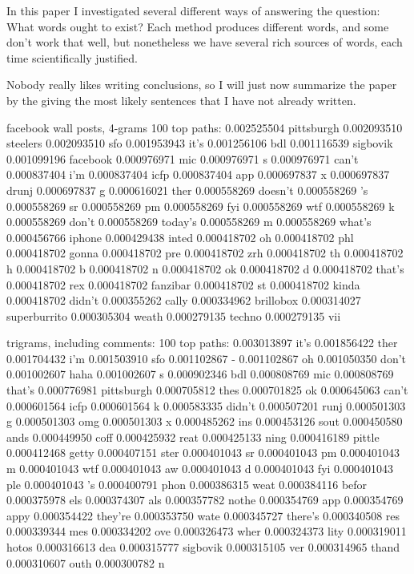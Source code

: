 \documentclass[twocolumn]{article}
\begin{document}
In this paper I investigated several different ways of answering the
question: What words ought to exist? Each method produces different
words, and some don't work that well, but nonetheless we have several
rich sources of words, each time scientifically justified.

Nobody really likes writing conclusions, so I will just now summarize
the paper by the giving the most likely sentences that I have not
already written.


facebook wall posts, 4-grams
100 top paths:
0.002525504 pittsburgh
0.002093510 steelers
0.002093510 sfo
0.001953943 it's
0.001256106 bdl
0.001116539 sigbovik
0.001099196 facebook
0.000976971 mic
0.000976971 s
0.000976971 can't
0.000837404 i'm
0.000837404 icfp
0.000837404 app
0.000697837 x
0.000697837 drunj
0.000697837 g
0.000616021 ther
0.000558269 doesn't
0.000558269 's
0.000558269 sr
0.000558269 pm
0.000558269 fyi
0.000558269 wtf
0.000558269 k
0.000558269 don't
0.000558269 today's
0.000558269 m
0.000558269 what's
0.000456766 iphone
0.000429438 inted
0.000418702 oh
0.000418702 phl
0.000418702 gonna
0.000418702 pre
0.000418702 zrh
0.000418702 th
0.000418702 h
0.000418702 b
0.000418702 n
0.000418702 ok
0.000418702 d
0.000418702 that's
0.000418702 rex
0.000418702 fanzibar
0.000418702 st
0.000418702 kinda
0.000418702 didn't
0.000355262 cally
0.000334962 brillobox
0.000314027 superburrito
0.000305304 weath
0.000279135 techno
0.000279135 vii


trigrams, including comments:
100 top paths:
0.003013897 it's
0.001856422 ther
0.001704432 i'm
0.001503910 sfo
0.001102867 -
0.001102867 oh
0.001050350 don't
0.001002607 haha
0.001002607 s
0.000902346 bdl
0.000808769 mic
0.000808769 that's
0.000776981 pittsburgh
0.000705812 thes
0.000701825 ok
0.000645063 can't
0.000601564 icfp
0.000601564 k
0.000583335 didn't
0.000507201 runj
0.000501303 g
0.000501303 omg
0.000501303 x
0.000485262 ins
0.000453126 sout
0.000450580 ands
0.000449950 coff
0.000425932 reat
0.000425133 ning
0.000416189 pittle
0.000412468 getty
0.000407151 ster
0.000401043 sr
0.000401043 pm
0.000401043 m
0.000401043 wtf
0.000401043 aw
0.000401043 d
0.000401043 fyi
0.000401043 ple
0.000401043 's
0.000400791 phon
0.000386315 weat
0.000384116 befor
0.000375978 els
0.000374307 als
0.000357782 nothe
0.000354769 app
0.000354769 appy
0.000354422 they're
0.000353750 wate
0.000345727 there's
0.000340508 res
0.000339344 mes
0.000334202 ove
0.000326473 wher
0.000324373 lity
0.000319011 hotos
0.000316613 dea
0.000315777 sigbovik
0.000315105 ver
0.000314965 thand
0.000310607 outh
0.000300782 n
\end{document}
